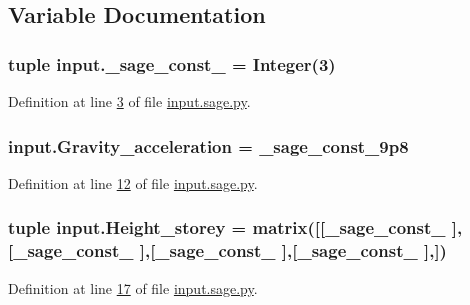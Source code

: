 \subsection{Variable Documentation}
\hypertarget{namespaceinput_a807fd6f7029374e2d9e918088f60bb88}{}
\subsubsection[{\+\_\+sage\+\_\+const\+\_\+3}]{\setlength{\rightskip}{0pt plus 5cm}tuple input.\+\_\+sage\+\_\+const\+\_ = Integer(3)}\label{namespaceinput_a807fd6f7029374e2d9e918088f60bb88}


Definition at line \hyperlink{input_8sage_8py_source_l00003}{3} of file \hyperlink{input_8sage_8py_source}{input.\+sage.\+py}.

\hypertarget{namespaceinput_a55ab15c1c171513e99332aa50c723764}{}
\subsubsection[{Gravity\+\_\+acceleration}]{\setlength{\rightskip}{0pt plus 5cm}input.\+Gravity\+\_\+acceleration = \+\_\+sage\+\_\+const\+\_\+9p8}\label{namespaceinput_a55ab15c1c171513e99332aa50c723764}


Definition at line \hyperlink{input_8sage_8py_source_l00012}{12} of file \hyperlink{input_8sage_8py_source}{input.\+sage.\+py}.

\hypertarget{namespaceinput_a01ad5b8730285b6aaebb2bc3f3fc0894}{}
\subsubsection[{Height\+\_\+storey}]{\setlength{\rightskip}{0pt plus 5cm}tuple input.\+Height\+\_\+storey = matrix(\mbox{[}\mbox{[}\+\_\+sage\+\_\+const\+\_ \mbox{]},\mbox{[}\+\_\+sage\+\_\+const\+\_ \mbox{]},\mbox{[}\+\_\+sage\+\_\+const\+\_ \mbox{]},\mbox{[}\+\_\+sage\+\_\+const\+\_ \mbox{]},\mbox{]})}\label{namespaceinput_a01ad5b8730285b6aaebb2bc3f3fc0894}


Definition at line \hyperlink{input_8sage_8py_source_l00017}{17} of file \hyperlink{input_8sage_8py_source}{input.\+sage.\+py}.

